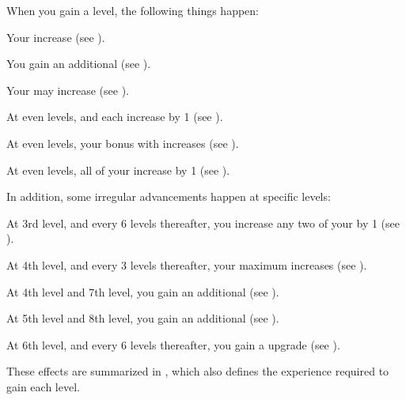    When you gain a level, the following things happen:
    \begin{raggeditemize}
        \item Your  increase (see ).
        \item You gain an additional  (see ).
        \item Your  may increase (see ).
        \item At even levels,  and  each increase by 1 (see ).
        \item At even levels, your bonus with  increases (see ).
        \item At even levels, all of your  increase by 1 (see ).
    \end{raggeditemize}

    In addition, some irregular advancements happen at specific levels:
    \begin{raggeditemize}
        \item At 3rd level, and every 6 levels thereafter, you increase any two of your  by 1 (see ).
        \item At 4th level, and every 3 levels thereafter, your maximum  increases (see ).
        \item At 4th level and 7th level, you gain an additional  (see ).
        \item At 5th level and 8th level, you gain an additional  (see ).
        \item At 6th level, and every 6 levels thereafter, you gain a  upgrade (see ).
    \end{raggeditemize}

    These effects are summarized in , which also defines the experience required to gain each level.

